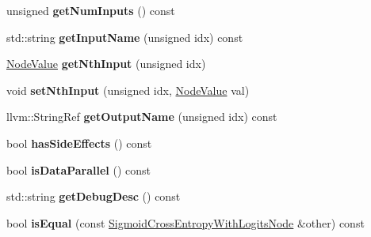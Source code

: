 \begin{DoxyCompactItemize}
unsigned {\bfseries get\+Num\+Inputs} () const
\item 
\mbox{\label{classglow_1_1_sigmoid_cross_entropy_with_logits_node_a14bf9bed7d6e15db25353cc0a5d3d55b}} 
std\+::string {\bfseries get\+Input\+Name} (unsigned idx) const
\item 
\mbox{\label{classglow_1_1_sigmoid_cross_entropy_with_logits_node_a026ecaa4f6379c7e3a0a4219993a06e1}} 
\hyperlink{structglow_1_1_node_value}{Node\+Value} {\bfseries get\+Nth\+Input} (unsigned idx)
\item 
\mbox{\label{classglow_1_1_sigmoid_cross_entropy_with_logits_node_a3494d3436e21d427ac5ccb12a6bd6a5c}} 
void {\bfseries set\+Nth\+Input} (unsigned idx, \hyperlink{structglow_1_1_node_value}{Node\+Value} val)
\item 
\mbox{\label{classglow_1_1_sigmoid_cross_entropy_with_logits_node_a03af97df00c233de7974b44c6391080d}} 
llvm\+::\+String\+Ref {\bfseries get\+Output\+Name} (unsigned idx) const
\item 
\mbox{\label{classglow_1_1_sigmoid_cross_entropy_with_logits_node_a67c47402eae77ad5ab29303f29500934}} 
bool {\bfseries has\+Side\+Effects} () const
\item 
\mbox{\label{classglow_1_1_sigmoid_cross_entropy_with_logits_node_a4edd53af2eea72d35c8fab73a6ef7034}} 
bool {\bfseries is\+Data\+Parallel} () const
\item 
\mbox{\label{classglow_1_1_sigmoid_cross_entropy_with_logits_node_ade2403c491c4e1e1586054fd38db7a5a}} 
std\+::string {\bfseries get\+Debug\+Desc} () const
\item 
\mbox{\label{classglow_1_1_sigmoid_cross_entropy_with_logits_node_a9a5a6e3da0bc8b308bbf51d1cecda47c}} 
bool {\bfseries is\+Equal} (const \hyperlink{classglow_1_1_sigmoid_cross_entropy_with_logits_node}{Sigmoid\+Cross\+Entropy\+With\+Logits\+Node} \&other) const

\end{DoxyCompactItemize}
